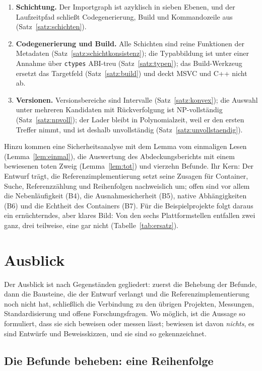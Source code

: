 \begin{enumerate}
	\item \textbf{Schichtung.} Der Importgraph ist azyklisch in sieben Ebenen, und der Laufzeitpfad schließt Codegenerierung, Build und Kommandozeile aus (Satz~\ref{satz:schichten}).
	\item \textbf{Codegenerierung und Build.} Alle Schichten sind reine Funktionen der Metadaten (Satz~\ref{satz:schichtkonsistenz}); die Typabbildung ist unter einer Annahme über \texttt{ctypes} ABI-treu (Satz~\ref{satz:typen}); das Build-Werkzeug ersetzt das Targetfeld (Satz~\ref{satz:build}) und deckt MSVC und C++ nicht ab.
	\item \textbf{Versionen.} Versionsbereiche sind Intervalle (Satz~\ref{satz:konvex}); die Auswahl unter mehreren Kandidaten mit Rückverfolgung ist NP-vollständig (Satz~\ref{satz:npvoll}); der Lader bleibt in Polynomialzeit, weil er den ersten Treffer nimmt, und ist deshalb unvollständig (Satz~\ref{satz:unvollstaendig}).
\end{enumerate}

Hinzu kommen eine Sicherheitsanalyse mit dem Lemma vom einmaligen Lesen (Lemma~\ref{lem:einmal}), die Auswertung des Abdeckungsberichts mit einem bewiesenen toten Zweig (Lemma~\ref{lem:tot}) und vierzehn Befunde. Ihr Kern: Der Entwurf trägt, die Referenzimplementierung setzt seine Zusagen für Container, Suche, Referenzzählung und Reihenfolgen nachweislich um; offen sind vor allem die Nebenläufigkeit (B4), die Ausnahmesicherheit (B5), native Abhängigkeiten (B6) und die Echtheit des Containers (B7). Für die Beispielprojekte folgt daraus ein ernüchterndes, aber klares Bild: Von den sechs Plattformstellen entfallen zwei ganz, drei teilweise, eine gar nicht (Tabelle~\ref{tab:ersatz}).

\chapter{Ausblick}
\label{chap:ausblick}

Der Ausblick ist nach Gegenständen gegliedert: zuerst die Behebung der Befunde, dann die Bausteine, die der Entwurf verlangt und die Referenzimplementierung noch nicht hat, schließlich die Verbindung zu den übrigen Projekten, Messungen, Standardisierung und offene Forschungsfragen. Wo möglich, ist die Aussage so formuliert, dass sie sich beweisen oder messen lässt; bewiesen ist davon \emph{nichts}, es sind Entwürfe und Beweisskizzen, und sie sind so gekennzeichnet.

\section{Die Befunde beheben: eine Reihenfolge}

